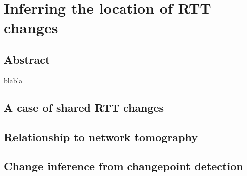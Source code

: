 \chapter{Inferring the location of RTT changes}
\label{sec:infer}
\section*{Abstract}
blabla
\section{A case of shared RTT changes}
\section{Relationship to network tomography}
\section{Change inference from changepoint detection}